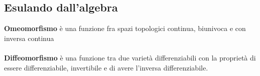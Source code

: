 \documentclass[10pt,a4paper]{article}
\begin{document}
\subsection{Esulando dall'algebra}
\textbf{Omeomorfismo} è una funzione fra spazi topologici continua, biunivoca e con inversa continua\\\\
\textbf{Diffeomorfismo} è una funzione tra due varietà differenziabili con la proprietà di essere differenziabile, invertibile e di avere l'inversa differenziabile.
\end{document}
